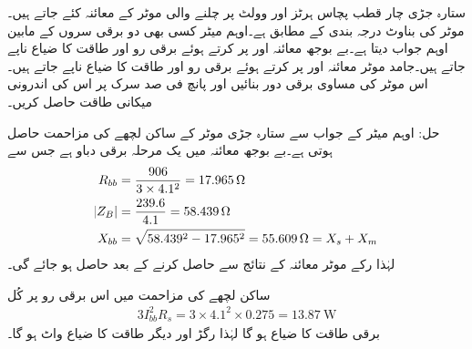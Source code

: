 ستارہ جڑی چار قطب پچاس ہرٹز اور  وولٹ پر چلنے والی موٹر کے معائنہ کئے جاتے ہیں۔ موٹر کی بناوٹ درجہ بندی   کے مطابق ہے۔اوہم میٹر کسی بھی دو برقی سروں کے مابین  اوہم جواب دیتا ہے۔بے بوجھ معائنہ  اور  پر کرتے ہوئے برقی رو  اور طاقت کا ضیاع  ناپے جاتے ہیں۔جامد موٹر معائنہ   اور  پر کرتے ہوئے برقی رو  اور طاقت کا ضیاع  ناپے جاتے ہیں۔اس موٹر کی مساوی برقی دور بنائیں اور پانچ فی صد سرک پر اس کی اندرونی میکانی طاقت حاصل کریں۔

حل:
	اوہم میٹر کے جواب سے  ستارہ جڑی موٹر کے ساکن لچھے کی مزاحمت  حاصل ہوتی ہے۔بے بوجھ معائنہ میں یک مرحلہ برقی دباو  ہے جس سے
\begin{align*}
R_{bb} &=\frac{906}{3 \times 4.1^2}=\SI{17.965}{\ohm}\\
\abs{Z_B}&=\frac{239.6}{4.1}=\SI{58.439}{\ohm}\\
X_{bb}&=\sqrt{58.439^2-17.965^2}=\SI{55.609}{\ohm}=X_s+X_m
\end{align*}
لہٰذا  رکے موٹر معائنہ کے نتائج سے  حاصل کرنے کے بعد  حاصل ہو جائے گی۔

ساکن لچھے کی مزاحمت میں اس برقی رو پر کُل
\begin{align*}
3 I_{bb}^2 R_s=3 \times 4.1^2 \times  0.275=\SI{13.87}{\watt}
\end{align*}
برقی طاقت کا ضیاع ہو گا لہٰذا رگڑ اور دیگر طاقت کا ضیاع  واٹ ہو گا۔

